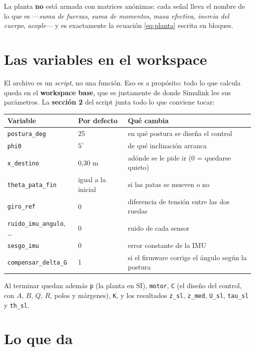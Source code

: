 \documentclass[11pt,a4paper]{report}
\begin{document}
La planta \textbf{no} está armada con matrices anónimas: cada señal lleva el nombre de lo que es
---\emph{suma de fuerzas}, \emph{suma de momentos}, \emph{masa efectiva}, \emph{inercia del
cuerpo}, \emph{acople}--- y es exactamente la ecuación \eqref{eq:planta} escrita en bloques.

\section{Las variables en el workspace}

El archivo es un \emph{script}, no una función. Eso es a propósito: todo lo que calcula queda
en el \textbf{workspace base}, que es justamente de donde Simulink lee sus parámetros. La
\textbf{sección 2} del script junta todo lo que conviene tocar:

\begin{center}
\small
\begin{tabular}{@{}llp{7.4cm}@{}}
\toprule
\textbf{Variable} & \textbf{Por defecto} & \textbf{Qué cambia} \\
\midrule
\texttt{postura\_deg} & 25 & en qué postura se diseña el control \\
\texttt{phi0} & $5^\circ$ & de qué inclinación arranca \\
\texttt{x\_destino} & 0,30 m & adónde se le pide ir (0 = quedarse quieto) \\
\texttt{theta\_pata\_fin} & igual a la inicial & si las patas se mueven o no \\
\texttt{giro\_ref} & 0 & diferencia de tensión entre las dos ruedas \\
\texttt{ruido\_imu\_angulo}, \ldots & 0 & ruido de cada sensor \\
\texttt{sesgo\_imu} & 0 & error constante de la IMU \\
\texttt{compensar\_delta\_G} & 1 & si el firmware corrige el ángulo según la postura \\
\bottomrule
\end{tabular}
\end{center}

Al terminar quedan además \texttt{p} (la planta en SI), \texttt{motor}, \texttt{C} (el diseño
del control, con $A$, $B$, $Q$, $R$, polos y márgenes), \texttt{K}, y los resultados
\texttt{z\_sl}, \texttt{z\_med}, \texttt{U\_sl}, \texttt{tau\_sl} y \texttt{th\_sl}.

\section{Lo que da}
\end{document}
